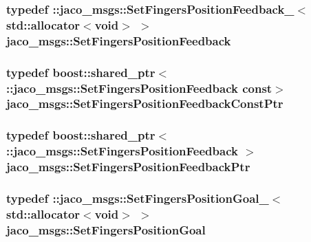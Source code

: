 \subsubsection[{\texorpdfstring{Set\+Fingers\+Position\+Feedback}{SetFingersPositionFeedback}}]{\setlength{\rightskip}{0pt plus 5cm}typedef \+::{\bf jaco\+\_\+msgs\+::\+Set\+Fingers\+Position\+Feedback\+\_\+}$<$std\+::allocator$<$void$>$ $>$ {\bf jaco\+\_\+msgs\+::\+Set\+Fingers\+Position\+Feedback}}\hypertarget{namespacejaco__msgs_a27b05a5ba36d09c1620de5791e2362d0}{}\label{namespacejaco__msgs_a27b05a5ba36d09c1620de5791e2362d0}
\subsubsection[{\texorpdfstring{Set\+Fingers\+Position\+Feedback\+Const\+Ptr}{SetFingersPositionFeedbackConstPtr}}]{\setlength{\rightskip}{0pt plus 5cm}typedef boost\+::shared\+\_\+ptr$<$ \+::{\bf jaco\+\_\+msgs\+::\+Set\+Fingers\+Position\+Feedback} const$>$ {\bf jaco\+\_\+msgs\+::\+Set\+Fingers\+Position\+Feedback\+Const\+Ptr}}\hypertarget{namespacejaco__msgs_a4cd23b19230769d7622c5cbe9b85b418}{}\label{namespacejaco__msgs_a4cd23b19230769d7622c5cbe9b85b418}
\subsubsection[{\texorpdfstring{Set\+Fingers\+Position\+Feedback\+Ptr}{SetFingersPositionFeedbackPtr}}]{\setlength{\rightskip}{0pt plus 5cm}typedef boost\+::shared\+\_\+ptr$<$ \+::{\bf jaco\+\_\+msgs\+::\+Set\+Fingers\+Position\+Feedback} $>$ {\bf jaco\+\_\+msgs\+::\+Set\+Fingers\+Position\+Feedback\+Ptr}}\hypertarget{namespacejaco__msgs_a36fc7cf1f2876946c317d3c56f245b24}{}\label{namespacejaco__msgs_a36fc7cf1f2876946c317d3c56f245b24}
\subsubsection[{\texorpdfstring{Set\+Fingers\+Position\+Goal}{SetFingersPositionGoal}}]{\setlength{\rightskip}{0pt plus 5cm}typedef \+::{\bf jaco\+\_\+msgs\+::\+Set\+Fingers\+Position\+Goal\+\_\+}$<$std\+::allocator$<$void$>$ $>$ {\bf jaco\+\_\+msgs\+::\+Set\+Fingers\+Position\+Goal}}\hypertarget{namespacejaco__msgs_a3a39b1d113922c8426dca543c0a63e5e}{}\label{namespacejaco__msgs_a3a39b1d113922c8426dca543c0a63e5e}
